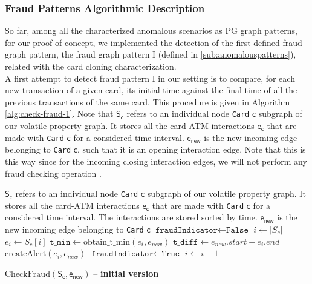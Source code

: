 \subsubsection*{Fraud Patterns Algorithmic Description}

So far, among all the characterized anomalous scenarios as PG graph patterns, for our proof of concept, 
we implemented the detection of the first defined fraud graph pattern, the fraud graph pattern I (defined in \ref{sub:anomalouspatterns}), 
related with the card cloning characterization.\\

A first attempt to detect fraud pattern I in our setting is to compare, for each new transaction of a given card, 
its initial time against the final time of all the previous transactions of the same card. 
This procedure is given in Algorithm \ref{alg:check-fraud-1}. 
Note that $\mathsf{S_c}$ refers to an individual node \texttt{Card} $\mathsf{c}$ subgraph of our volatile property graph. 
It stores all the card-ATM interactions $\mathsf{e_c}$ that are made with \texttt{Card} $\mathsf{c}$ for a considered time interval. 
$\mathsf{e_{new}}$ is the new incoming edge belonging to \texttt{Card} $\mathsf{c}$, such that it is an opening interaction edge. 
Note that this is this way since for the incoming closing interaction edges, we will not perform any fraud checking operation .

\begin{algorithm}[H]
    \small
    \begin{algorithmic}[1]
    \REQUIRE $\mathsf{S_c}$ refers to an individual node \texttt{Card} $\mathsf{c}$ subgraph of our volatile property graph. 
    It stores all the card-ATM interactions $\mathsf{e_c}$ that are made with \texttt{Card} $\mathsf{c}$ for a considered time interval. 
    The interactions are stored sorted by time.
    \REQUIRE $\mathsf{e_{new}}$ is the new incoming edge belonging to \texttt{Card} $\mathsf{c}$
    \STATE $\texttt{fraudIndicator} \gets \texttt{False}$
    \STATE $i \gets |S_c|$
      \STATE $e_i \gets S_c[i]$
      \STATE $\texttt{t\_min} \gets \text{obtain\_t\_min}(e_i, e_{new})$
      \STATE $\texttt{t\_diff} \gets e_{new}.start - e_i.end$
        \STATE $\text{createAlert}(e_i, e_{new})$
        \STATE $\texttt{fraudIndicator} \gets \texttt{True}$
      \ENDIF
      \STATE $i \gets i - 1$
    \ENDWHILE
    \end{algorithmic}
    \caption{$\text{CheckFraud}(\mathsf{S_c}, \mathsf{e_{new}})$ -- \textbf{initial version}}
    \label{alg:check-fraud-1}
\end{algorithm}

